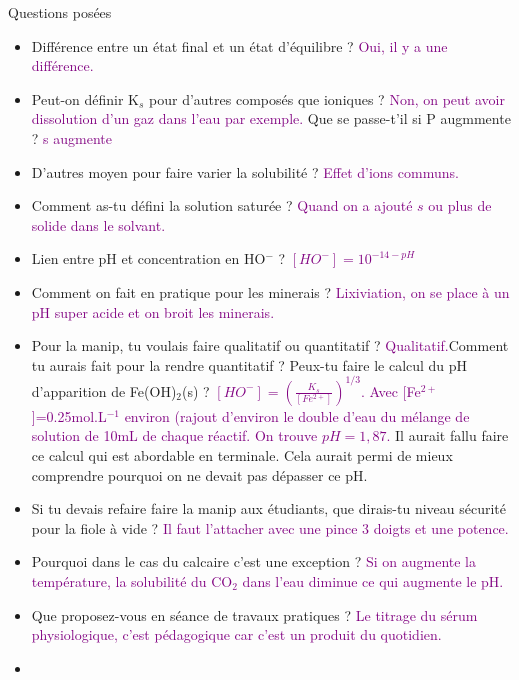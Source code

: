 \begin{reportBlock}{Questions posées}
\begin{itemize}
\item Différence entre un état final et un état d'équilibre ? \textcolor{purple}{Oui, il y a une différence. }

\item Peut-on définir K$_s$ pour d'autres composés que ioniques ? \textcolor{purple}{Non, on peut avoir dissolution d'un gaz dans l'eau par exemple.} Que se passe-t'il si P augmmente ? \textcolor{purple}{s augmente}

\item D'autres moyen pour faire varier la solubilité ? \textcolor{purple}{Effet d'ions communs.} 

\item Comment as-tu défini la solution saturée ? \textcolor{purple}{Quand on a ajouté $s$ ou plus de solide dans le solvant.}

\item Lien entre pH et concentration en HO$^-$ ?
\textcolor{purple}{$[HO^-]=10^{-14-pH}$}

\item Comment on fait en pratique pour les minerais ? \textcolor{purple}{Lixiviation, on se place à un pH super acide et on broit les minerais.}

\item Pour la manip, tu voulais faire qualitatif ou quantitatif ?  \textcolor{purple}{Qualitatif.}Comment tu aurais fait pour la rendre quantitatif ? Peux-tu faire le calcul du pH d'apparition de Fe(OH)$_2$(s) ? \textcolor{purple}{$[HO^-]=(\frac{K_s}{[Fe^{2+}]})^{1/3}$. Avec [Fe$^{2+}$]=0.25mol.L$^{-1}$ environ (rajout d'environ le double d'eau du mélange de solution de 10mL de chaque réactif. On trouve $pH=1,87$.} Il aurait fallu faire ce calcul qui est abordable en terminale. Cela aurait permi de mieux comprendre pourquoi on ne devait pas dépasser ce pH.

\item Si tu devais refaire faire la manip aux étudiants, que dirais-tu niveau sécurité pour la fiole à vide ? \textcolor{purple}{Il faut l'attacher avec une pince 3 doigts et une potence.}

\item Pourquoi dans le cas du calcaire c'est une exception ? \textcolor{purple}{Si on augmente la température, la solubilité du CO$_2$ dans l'eau diminue ce qui augmente le pH. }

\item Que proposez-vous en séance de travaux pratiques ? \textcolor{purple}{Le titrage du sérum physiologique, c'est pédagogique car c'est un produit du quotidien.}

\item 
\textcolor{purple}{}

\end{itemize}


\end{reportBlock}

